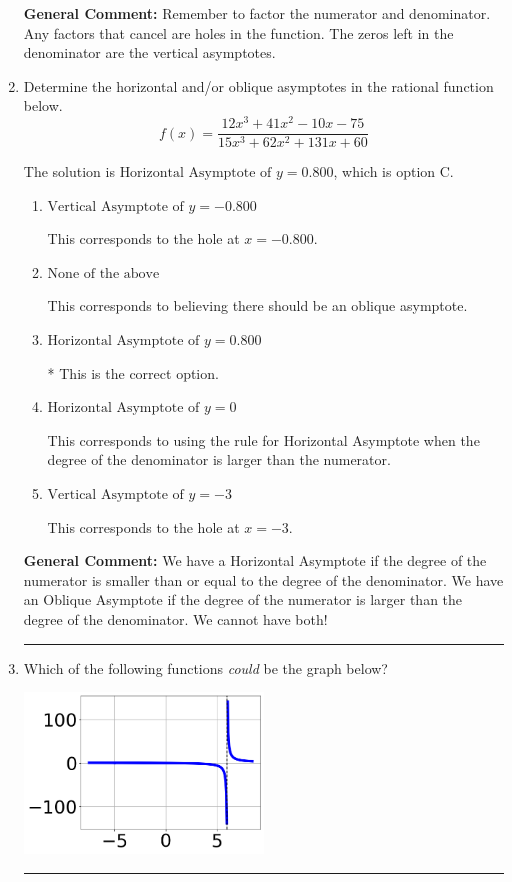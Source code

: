 \documentclass{extbook}[14pt]
\newcommand{\litem}[1]{\item #1

\rule{\textwidth}{0.4pt}}
\begin{document}
\begin{enumerate}
{\textbf{General Comment:} Remember to factor the numerator and denominator. Any factors that cancel are holes in the function. The zeros left in the denominator are the vertical asymptotes.
}
\litem{
Determine the horizontal and/or oblique asymptotes in the rational function below.
\[ f(x) = \frac{12x^{3} +41 x^{2} -10 x -75}{15x^{3} +62 x^{2} +131 x + 60} \]

The solution is \( \text{Horizontal Asymptote of } y = 0.800  \), which is option C.\begin{enumerate}[label=\Alph*.]
\item \( \text{Vertical Asymptote of } y = -0.800  \)

This corresponds to the hole at $x = -0.800$.
\item \( \text{None of the above} \)

This corresponds to believing there should be an oblique asymptote.
\item \( \text{Horizontal Asymptote of } y = 0.800  \)

* This is the correct option.
\item \( \text{Horizontal Asymptote of } y = 0  \)

This corresponds to using the rule for Horizontal Asymptote when the degree of the denominator is larger than the numerator.
\item \( \text{Vertical Asymptote of } y = -3  \)

This corresponds to the hole at $x = -3$.
\end{enumerate}

\textbf{General Comment:} We have a Horizontal Asymptote if the degree of the numerator is smaller than or equal to the degree of the denominator. We have an Oblique Asymptote if the degree of the numerator is larger than the degree of the denominator. We cannot have both!
}
\litem{
Which of the following functions \textit{could} be the graph below?

\begin{center}
    \includegraphics[width=0.5\textwidth]{../Figures/identifyGraphOfRationalFunctionCopyB.png}
\end{center}




}
\end{enumerate}
\end{document}
